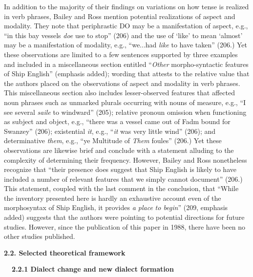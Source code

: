 \begin{styleStandard}
In addition to the majority of their findings on variations on how tense is realized in verb phrases, Bailey and Ross mention potential realizations of aspect and modality. They note that periphrastic DO may be a manifestation of aspect, e.g., “in this bay vessels \textit{doe} use to stop” (206) and the use of ‘like’ to mean ‘almost’ may be a manifestation of modality, e.g., “we...had \textit{like} to have taken” (206.) Yet these observations are limited to a few sentences supported by three examples and included in a miscellaneous section entitled “\textit{Other }morpho-syntactic features of Ship English” (emphasis added); wording that attests to the relative value that the authors placed on the observations of aspect and modality in verb phrases. This miscellaneous section also includes lesser-observed features that affected noun phrases such as unmarked plurals occurring with nouns of measure, e.g., “I see several \textit{saile} to windward” (205); relative pronoun omission when functioning as subject and object, e.g., “there was a vessel came out of Fadm bound for Swanzey” (206); existential \textit{it}, e.g., “\textit{it} was very little wind” (206); and determinative \textit{them}, e.g., “ye Multitude of \textit{Them} foules” (206.) Yet these observations are likewise brief and conclude with a statement alluding to the complexity of determining their frequency. However, Bailey and Ross nonetheless recognize that “their presence does suggest that Ship English is likely to have included a number of relevant features that we simply cannot document” (206.) This statement, coupled with the last comment in the conclusion, that “While the inventory presented here is hardly an exhaustive account even of the morphosyntax of Ship English, it provides \textit{a place} \textit{to begin}” (209, emphasis added) suggests that the authors were pointing to potential directions for future studies. However, since the publication of this paper in 1988, there have been no other studies published. \ 
\end{styleStandard}


\begin{styleStandard}
\textbf{2.2. Selected theoretical framework}
\end{styleStandard}


\begin{styleStandard}
\textbf{\ \ 2.2.1 Dialect change and new dialect formation }
\end{styleStandard}


